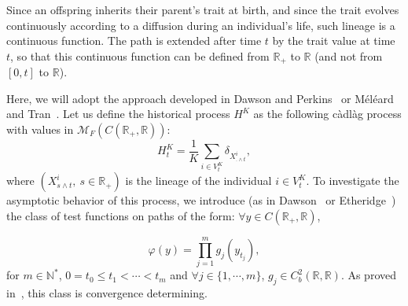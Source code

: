 \documentclass[10pt]{amsart}
\theoremstyle{definition}\newtheorem{defi}[theo]{Definition}\newtheorem{rema}[theo]{Remark}\newtheorem{exam}[theo]{Example}\newtheorem{exem}[theo]{Example}\newtheorem{nota}[theo]{Notation}
\newcommand{\Mo}{\mathcal{M}}
\newcommand*\N{\mathbb{N}}
\newcommand*\R{\mathbb{R}}
\let\oldforall\forall
\renewcommand*{\forall}{\mathrel{\oldforall}}
\begin{document}
Since an offspring inherits their parent's trait at birth, and since the trait evolves continuously according to a diffusion during an individual's life, such lineage is a continuous function. The path is extended after time $t$ by the trait value at time $t$, so that this continuous function can be defined from $\R_+$ to $\R$ (and not from $[0,t]$ to $\R$).


Here, we will adopt the approach developed in Dawson and Perkins~\cite{dawsonperkinsAMS} or Méléard and Tran~\cite{meleardtran_suphist}. Let us define the historical process $H^K$ as the following càdlàg process with values in $\Mo_F(C(\R_+,\R))$:
\begin{equation}\label{def:HKt}
H^K_t=\frac{1}{K} \sum_{i \in V^K_t} \delta_{X^i_{.\wedge t}},
\end{equation}
where $(X^i_{s\wedge t},\ s\in \R_+)$ is the lineage of the individual $i\in V^K_t$. To investigate the asymptotic behavior of this process, we introduce (as in Dawson~\cite{dawson} or Etheridge~\cite{etheridgebook}) the class of test functions on paths of the form: $\forall y\in C(\R_+,\R)$,

\begin{equation}\label{test-function}
\varphi(y) = \prod_{j=1}^m g_{j}\left(y_{t_{j}}\right),
\end{equation}
for $m\in \N^*$, $0=t_0\le t_{1}<\cdots <t_{m}$ and $\forall j \in \{1,\cdots,m\}$, $g_{j}\in C^2_{b}(\R, \R)$. As proved in~\cite{dawson}, this class is convergence determining.
\end{document}
